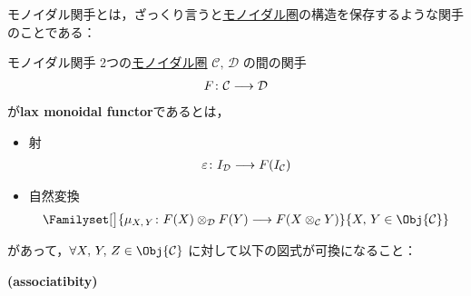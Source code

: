 \documentclass[TQFT_main]{subfiles}
\begin{document}
モノイダル関手とは，ざっくり言うと\hyperref[def:monoidal-category]{モノイダル圏}の構造を保存するような関手のことである：
\begin{mydef}[label=def:monidal-functor,breakable]{モノイダル関手}
    2つの\hyperref[def:monoidal-category]{モノイダル圏} $\mathcal{C},\, \mathcal{D}$ の間の関手
    \begin{align}
        F \colon \mathcal{C} \longrightarrow \mathcal{D}
    \end{align}
    が\textbf{lax monoidal functor}であるとは，
    \begin{itemize}
        \item 射
        \begin{align}
            \varepsilon \colon I_{\mathcal{D}} \longrightarrow F(I_{\mathcal{C}})
        \end{align}
        
        \item 自然変換
        \begin{align}
            \Familyset[\big]{\mu_{X,\, Y} \colon F(X) \otimes_{\mathcal{D}} F(Y) \lto F(X \otimes_{\mathcal{C}} Y)}{X,\, Y \in \Obj{\mathcal{C}}}
        \end{align}
    \end{itemize}
    があって，$\forall X,\, Y,\, Z \in \Obj{\mathcal{C}}$ に対して以下の図式が可換になること：
    \begin{description}
        \item[\textbf{(associatibity)}]　
        
        \begin{center}
        \end{center}
        

\end{description}
\end{mydef}
\end{document}
